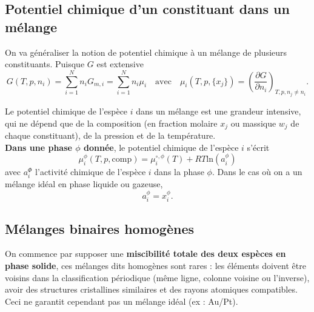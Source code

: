 \documentclass[11pt,a4paper]{report}
\begin{document}
\subsection{Potentiel chimique d'un constituant dans un mélange}

On va généraliser la notion de potentiel chimique à un mélange de plusieurs constituants. Puisque $G$ est extensive 
\begin{equation}
	G(T,p,n_i) = \sum_{i = 1}^{N} n_i G_{m,i} = \sum_{i = 1}^{N} n_i \mu_i
	\quad\text{avec}\quad 
	\mu_i(T,p,\{x_j\}) = \left(\frac{\partial G}{\partial n_i}\right)_{T,p,n_j\neq n_i}.
\end{equation}


Le potentiel chimique de l'espèce $i$ dans un mélange est une grandeur intensive, qui ne dépend que de la composition (en fraction molaire $x_j$ ou massique $w_j$ de chaque constituant), de la pression et de la température.\\

\textbf{Dans une phase $\phi$ donnée}, le potentiel chimique de l'espèce $i$ s'écrit
\begin{equation}
	\boxed{\mu_i^\phi(T,p,\text{comp}) = \mu_i^{\circ,\phi}(T)+ RT\text{ln}(a_i^\phi)} 
\end{equation}
avec $a_i^\Phi$ l'activité chimique de l'espèce $i$ dans la phase $\phi$. Dans le cas où on a un mélange idéal en phase liquide ou gazeuse,
\begin{equation}
	a_i^\phi = x_i^\phi.
\end{equation}

\subsection{Mélanges binaires homogènes}

On commence par supposer une \textbf{miscibilité totale des deux espèces en phase solide}, ces mélanges dits homogènes sont rares : les éléments doivent être voisins dans la classification périodique (même ligne, colonne voisine ou l'inverse), avoir des structures cristallines similaires et des rayons atomiques compatibles. Ceci ne garantit cependant pas un mélange idéal (ex : Au/Pt).
\end{document}
